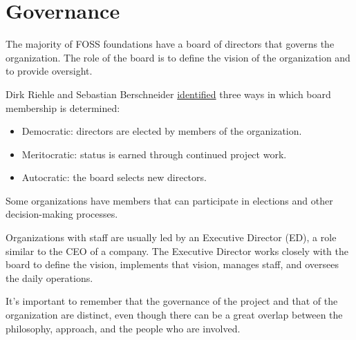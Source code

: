 


\chapter{Governance}

The majority of FOSS foundations have a board of directors that governs the organization.  The role of the board is to define the vision of the organization and to provide oversight.

Dirk Riehle and Sebastian Berschneider \href{https://doi.org/10.1007/978-3-642-33442-9_2}{identified} three ways in which board membership is determined:

\begin{itemize}

\item Democratic: directors are elected by members of the organization.

\item Meritocratic: status is earned through continued project work.

\item Autocratic: the board selects new directors.

\end{itemize}

Some organizations have members that can participate in elections and other decision-making processes.

Organizations with staff are usually led by an Executive Director (ED), a role similar to the CEO of a company.  The Executive Director works closely with the board to define the vision, implements that vision, manages staff, and oversees the daily operations.

It's important to remember that the governance of the project and that of the organization are distinct, even though there can be a great overlap between the philosophy, approach, and the people who are involved.

